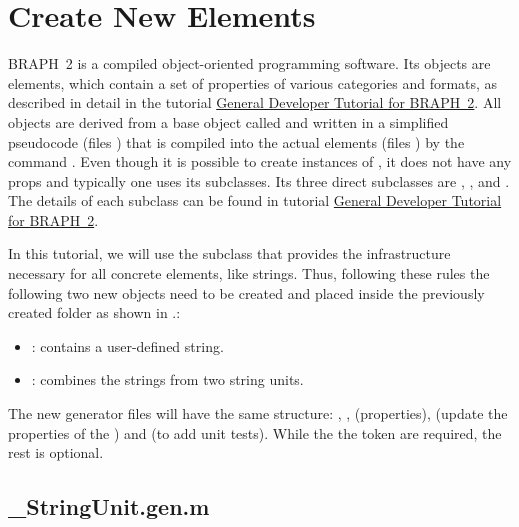 \documentclass{tufte-handout}
\begin{document}

\section{Create New Elements}

BRAPH~2 is a compiled object-oriented programming software. Its
objects are elements, which contain a set of properties of various categories and formats, as described in detail in the tutorial \href{https://github.com/braph-software/BRAPH-2/tree/develop/tutorials/developers/dev_intro}{General Developer Tutorial for BRAPH~2}. All objects are derived from a base object called  and written in a simplified pseudocode (files ) that is compiled into the actual elements (files ) by the command .
Even though it is possible to create instances of , it does not have any props and typically one uses its subclasses. Its three direct subclasses are , , and . The details of each subclass can be found in tutorial \href{https://github.com/braph-software/BRAPH-2/tree/develop/tutorials/developers/dev_intro}{General Developer Tutorial for BRAPH~2}. 

In this tutorial, we will use the subclass   that provides the infrastructure necessary for all concrete elements, like strings.
Thus, following these rules the following two new objects need to be created and placed inside the previously created folder  as shown in .:
\begin{itemize}
	\item {}: contains a user-defined string. 
	\item {}: combines the strings from two string units.
\end{itemize}

The new generator files will have the same structure:   , ,  (properties),  (update the properties of the ) and  (to add unit tests). While the  the token  are required,
the rest is optional.

\clearpage

\subsection{\_StringUnit.gen.m}
\end{document}
